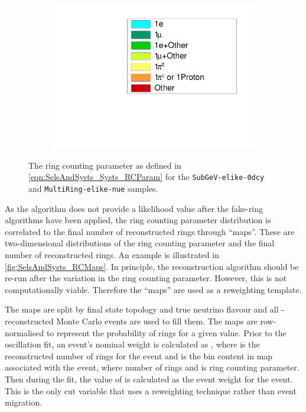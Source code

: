 \begin{figure}[h]
\begin{subfigure}[t]{0.49\textwidth}
    \includegraphics[width=\textwidth, trim={0mm 0mm 0mm 0mm}, clip,page=1]{Figures/Selections/RCParameterLegend.pdf}
  \end{subfigure}
  \caption{The ring counting parameter as defined in \autoref{eqn:SelsAndSysts_Systs_RCParam} for the \texttt{SubGeV-elike-0dcy} and \texttt{MultiRing-elike-nue} samples.}
  \label{fig:SelsAndSysts_RCParameterDistribution}
\end{figure}

As the \fq algorithm does not provide a likelihood value after the fake-ring algorithms have been applied, the ring counting parameter distribution is correlated to the final number of reconstructed rings through ``maps''. These are two-dimensional distributions of the ring counting parameter and the final number of reconstructed rings. An example is illustrated in \autoref{fig:SelsAndSysts_RCMaps}. In principle, the \fq reconstruction algorithm should be re-run after the variation in the ring counting parameter. However, this is not computationally viable. Therefore the ``maps'' are used as a reweighting template.

The maps are split by final state topology and true neutrino flavour and all \fq-reconstructed Monte Carlo events are used to fill them. The maps are row-normalised to represent the probability of  rings for a given  value. Prior to the oscillation fit, an event's nominal weight is calculated as , where  is the reconstructed number of rings for the  event and  is the bin content in map associated with the  event, where  number of rings and  is ring counting parameter. Then during the fit, the value of  is calculated as the event weight for the  event. This is the only cut variable that uses a reweighting technique rather than event migration.

